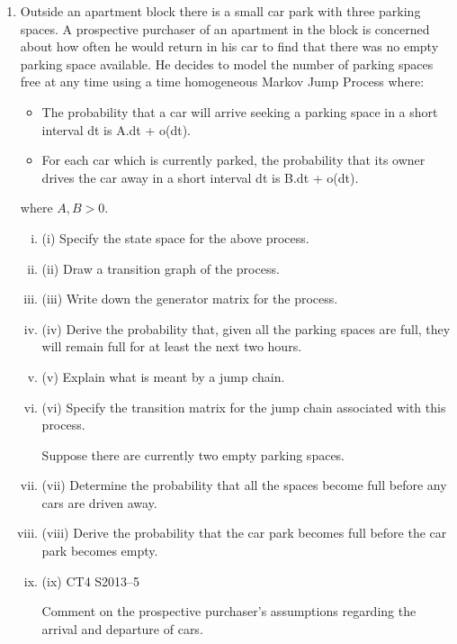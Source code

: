 \documentclass[a4paper,12pt]{article}
\begin{document}
\begin{enumerate}
\item Outside an apartment block there is a small car park with three parking spaces. A prospective purchaser of an apartment in the block is concerned about how often he
would return in his car to find that there was no empty parking space available. He decides to model the number of parking spaces free at any time using a time
homogeneous Markov Jump Process where:
\begin{itemize}
\item The probability that a car will arrive seeking a parking space in a short interval
dt is A.dt + o(dt).
\item For each car which is currently parked, the probability that its owner drives the
car away in a short interval dt is B.dt + o(dt).
\end{itemize}
where $A, B > 0$.
\begin{enumerate}[(i)]
\item (i) Specify the state space for the above process. 
\item (ii) Draw a transition graph of the process. 
\item (iii) Write down the generator matrix for the process. 
\item (iv) Derive the probability that, given all the parking spaces are full, they will
remain full for at least the next two hours. 
\item (v) Explain what is meant by a jump chain. 
\item (vi) Specify the transition matrix for the jump chain associated with this process.

Suppose there are currently two empty parking spaces.
\item (vii)
Determine the probability that all the spaces become full before any cars are
driven away.
\item
(viii) Derive the probability that the car park becomes full before the car park
becomes empty.
\item (ix)
CT4 S2013–5

Comment on the prospective purchaser’s assumptions regarding the arrival
and departure of cars.
\end{enumerate}
\end{enumerate}

\newpage
\end{document}
